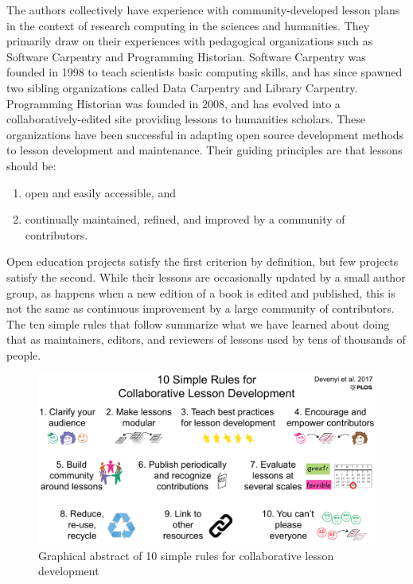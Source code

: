 \documentclass[10pt,letterpaper]{article}
\begin{document}
The authors collectively have experience with community-developed lesson plans
in the context of research computing in the sciences and humanities.
They primarily draw on their experiences with pedagogical organizations such as
Software Carpentry and Programming Historian.
Software Carpentry was founded in 1998 to teach scientists basic computing skills,
and has since spawned two sibling organizations called Data Carpentry and Library Carpentry.
Programming Historian was founded in 2008,
and has evolved into a collaboratively-edited site providing lessons to humanities scholars.
These organizations have been successful in adapting open source development methods
to lesson development and maintenance.
Their guiding principles are that lessons should be:

\begin{enumerate}

\item
  open and easily accessible, and

\item
  continually maintained, refined, and improved
  by a community of contributors.

\end{enumerate}

Open education projects satisfy the first criterion by definition,
but few projects satisfy the second.
While their lessons are occasionally updated by a small author group,
as happens when a new edition of a book is edited and published,
this is not the same as continuous improvement by a large community of contributors.
The ten simple rules that follow summarize what we have learned about doing that
as maintainers, editors, and reviewers of lessons used by tens of thousands of people.

\begin{figure}[ht]  %
\includegraphics[width=\linewidth]{figure1}
\caption{Graphical abstract of 10 simple rules for collaborative lesson development}
\label{figure1}
\end{figure}
%
\end{document}

